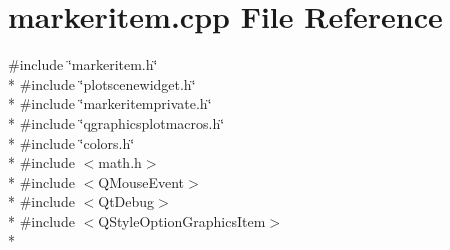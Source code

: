 \section{markeritem.\+cpp File Reference}
\label{items_2markeritem_8cpp}
{\ttfamily \#include \char`\"{}markeritem.\+h\char`\"{}}\\*
{\ttfamily \#include \char`\"{}plotscenewidget.\+h\char`\"{}}\\*
{\ttfamily \#include \char`\"{}markeritemprivate.\+h\char`\"{}}\\*
{\ttfamily \#include \char`\"{}qgraphicsplotmacros.\+h\char`\"{}}\\*
{\ttfamily \#include \char`\"{}colors.\+h\char`\"{}}\\*
{\ttfamily \#include $<$math.\+h$>$}\\*
{\ttfamily \#include $<$Q\+Mouse\+Event$>$}\\*
{\ttfamily \#include $<$Qt\+Debug$>$}\\*
{\ttfamily \#include $<$Q\+Style\+Option\+Graphics\+Item$>$}\\*
